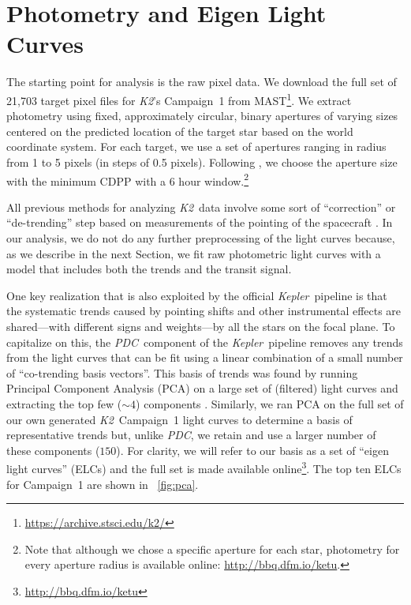 \documentclass[12pt,preprint]{aastex}
\newcommand{\project}[1]{\textsl{#1}} %
\newcommand{\kepler}{\project{Kepler}}
\newcommand{\KT}{\project{K2}}
\newcommand{\pdc}{\project{PDC}}
\newcommand{\figref}[1]{\ref{fig:#1}}
\newcommand{\Fig}[1]{\figurename~\figref{#1}}
\newcommand{\sectionname}{Section}
\newcommand{\sectlabel}[1]{\label{sect:#1}}
\newcommand{\datareleaseurl}{{\url{http://bbq.dfm.io/ketu}}}
\begin{document}
\section{Photometry and Eigen Light Curves}
\sectlabel{phot}

The starting point for analysis is the raw pixel data.
We download the full set of 21,703 target pixel files for \KT's Campaign~1
from MAST\footnote{\url{https://archive.stsci.edu/k2/}}.
We extract photometry using fixed, approximately circular, binary apertures of
varying sizes centered on the predicted location of the target star based on
the world coordinate system.
For each target, we use a set of apertures ranging in radius from 1 to 5
pixels (in steps of 0.5 pixels).
Following \citet{Vanderburg:2014}, we choose the aperture size with the
minimum CDPP \citep{Christiansen:2012} with a 6 hour window.\footnote{Note
that although we chose a specific aperture for each star, photometry for every
aperture radius is available online: \datareleaseurl.}

All previous methods for analyzing \KT\ data involve some sort of
``correction'' or ``de-trending'' step based on measurements of the pointing
of the spacecraft \citep{Vanderburg:2014, Aigrain:2015, Crossfield:2015}.
In our analysis, we do not do any further preprocessing of the light curves
because, as we describe in the next \sectionname, we fit raw photometric light
curves with a model that includes both the trends and the transit signal.

One key realization that is also exploited by the official \kepler\ pipeline
is that the systematic trends caused by pointing shifts and other instrumental
effects are shared---with different signs and weights---by all the stars on
the focal plane.
To capitalize on this, the \pdc\ component of the \kepler\ pipeline
removes any trends from the light curves that can be fit using a linear
combination of a small number of ``co-trending basis vectors''.
This basis of trends was found by running Principal Component Analysis (PCA)
on a large set of (filtered) light curves and extracting the top few ($\sim
4$) components \citep{Stumpe:2012, Smith:2012}.
Similarly, we ran PCA on the full set of our own generated \KT\ Campaign~1
light curves to determine a basis of representative trends but, unlike \pdc,
we retain and use a larger number of these components ($150$).
For clarity, we will refer to our basis as a set of ``eigen light curves''
(ELCs) and the full set is made available online\footnote{\datareleaseurl}.
The top ten ELCs for Campaign~1 are shown in \Fig{pca}.
\end{document}
